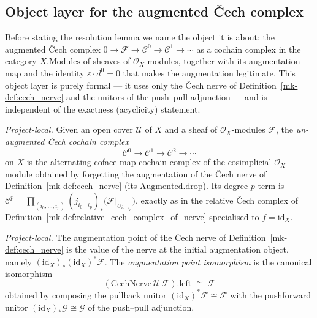 \subsection{Object layer for the augmented {\v C}ech complex}

Before stating the resolution lemma we name the object it is about: the augmented {\v C}ech complex
\(0 \to \mathcal{F} \to \mathcal{C}^0 \to \mathcal{C}^1 \to \cdots\) as a cochain complex in the
category \(X.\mathrm{Modules}\) of sheaves of \(\mathcal{O}_X\)-modules, together with its augmentation
map and the identity \(\varepsilon \cdot d^0 = 0\) that makes the augmentation legitimate. This object
layer is purely formal --- it uses only the {\v C}ech nerve of Definition~\ref{mk-def:cech_nerve} and the
unitors of the push--pull adjunction --- and is independent of the exactness (acyclicity) statement.

\begin{definition}\label{mk-def:cech_complex_on_X}
  \leanok

  \textit{Project-local.}
  Given an open cover \(\mathcal{U}\) of \(X\) and a sheaf of \(\mathcal{O}_X\)-modules \(\mathcal{F}\),
  the \emph{un-augmented {\v C}ech cochain complex}
  \[
    \mathcal{C}^0 \to \mathcal{C}^1 \to \mathcal{C}^2 \to \cdots
  \]
  on \(X\) is the alternating-coface-map cochain complex of the cosimplicial \(\mathcal{O}_X\)-module
  obtained by forgetting the augmentation of the {\v C}ech nerve of Definition~\ref{mk-def:cech_nerve}
  (its \(\mathrm{Augmented.drop}\)). Its degree-\(p\) term is \(\mathcal{C}^p =
  \prod_{(i_0, \ldots, i_p)} (j_{i_0 \ldots i_p})_*\bigl(\mathcal{F}|_{U_{i_0 \ldots i_p}}\bigr)\),
  exactly as in the relative {\v C}ech complex of
  Definition~\ref{mk-def:relative_cech_complex_of_nerve} specialised to \(f = \mathrm{id}_X\).
\end{definition}

\begin{definition}\label{mk-def:cech_nerve_point_iso}
  \leanok

  \textit{Project-local.}
  The augmentation point of the {\v C}ech nerve of Definition~\ref{mk-def:cech_nerve} is the value of the
  nerve at the initial augmentation object, namely \((\mathrm{id}_X)_* (\mathrm{id}_X)^* \mathcal{F}\).
  The \emph{augmentation point isomorphism} is the canonical isomorphism
  \[
    (\mathrm{CechNerve}\ \mathcal{U}\ \mathcal{F}).\mathrm{left} \;\cong\; \mathcal{F}
  \]
  obtained by composing the pullback unitor \((\mathrm{id}_X)^* \mathcal{F} \cong \mathcal{F}\) with the
  pushforward unitor \((\mathrm{id}_X)_* \mathcal{G} \cong \mathcal{G}\) of the push--pull adjunction.
\end{definition}

